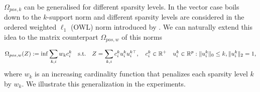 %
%

$\Omega_{pos,k}$ can be generalised for different sparsity levels. In the vector case   boils down to the $k$-support norm \citep{argyriou2012sparse} and different sparsity levels are considered in the ordered weighted $\ell_1$ (OWL) norm introduced by \citet{bogdan2013statistical}. We can naturally extend this idea to the matrix counterpart $\Omega_{pos,w}$ of this norms 

\begin{align}
\Omega_{pos,w}(Z):=\inf \sum_{k,i}w_{k}c_i^k \quad \text{s.t.} \quad Z=\sum_{k,i} c_i^k u_i^k u_{i}^{k\top}, \quad c_i^k\in \mathbb{R}^{+} \quad u_{i}^k\in\mathbb{R}^p  :   \|u_{i}^k\|_0 \leq k, \|u_{i}^k\|_2 = 1,
\end{align}
where $w_{k}$ is an increasing cardinality function that penalizes each sparsity level $k$ by $w_{k}$. We illustrate this generalization in the experiments.





